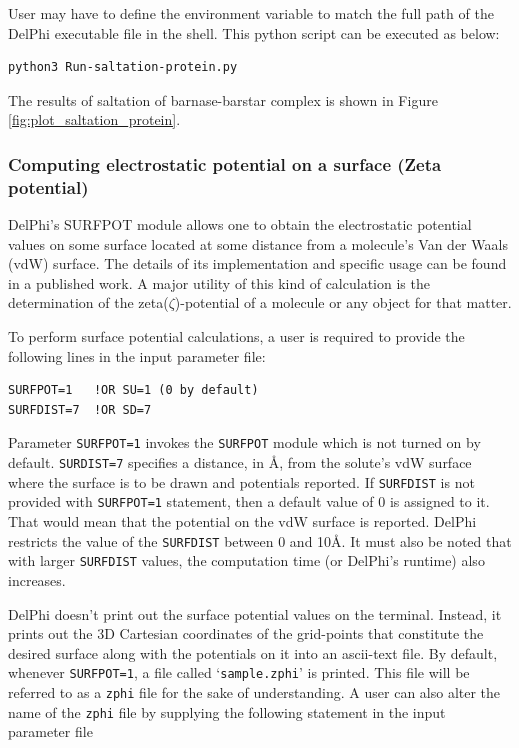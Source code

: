 \documentclass[9pt,tutorial]{livecoms}
\newcommand*\ttvar[1]{\texttt{\expandafter\dottvar\detokenize{#1}\relax}}
\newcommand*\dottvar[1]{\ifx\relax#1\else
  \expandafter\ifx\string_#1\string_\allowbreak\else#1\fi
  \expandafter\dottvar\fi}
\begin{document}
User may have to define the environment variable \ttvar{$DELPHI_EXE} to match the full path of the DelPhi executable file in the shell. This python script can be executed as below:

\begin{verbatim}
python3 Run-saltation-protein.py
\end{verbatim}

The results of saltation of barnase-barstar complex is shown in Figure \ref{fig:plot_saltation_protein}.

\subsubsection{Computing electrostatic potential on a surface (Zeta potential)} 
DelPhi’s SURFPOT module allows one to obtain the electrostatic potential values on some surface located at some distance from a molecule’s Van der Waals (vdW) surface. The details of its implementation and specific usage can be found in a published work\cite{chakravorty2017new}. A major utility of this kind of calculation is the determination of the zeta($\zeta$)-potential of a molecule or any object for that matter. 

To perform surface potential calculations, a user is required to provide the following lines in the input parameter file:

\begin{verbatim}
SURFPOT=1   !OR SU=1 (0 by default)
SURFDIST=7  !OR SD=7
\end{verbatim}

Parameter \texttt{SURFPOT=1} invokes the \texttt{SURFPOT} module which is not turned on by default. \texttt{SURDIST=7} specifies a distance, in Å, from the solute’s vdW surface where the surface is to be drawn and potentials reported. If \texttt{SURFDIST} is not provided with \texttt{SURFPOT=1} statement, then a default value of 0 is assigned to it. That would mean that the potential on the vdW surface is reported. DelPhi restricts the value of the \texttt{SURFDIST} between 0 and 10Å. It must also be noted that with larger \texttt{SURFDIST} values, the computation time (or DelPhi’s runtime) also increases. 

DelPhi doesn’t print out the surface potential values on the terminal. Instead, it prints out the 3D Cartesian coordinates of the grid-points that constitute the desired surface along with the potentials on it into an ascii-text file. By default, whenever \texttt{SURFPOT=1}, a file called ‘\texttt{sample.zphi}’ is printed. This file will be referred to as a \texttt{zphi} file for the sake of understanding. A user can also alter the name of the \texttt{zphi} file by supplying the following statement in the input parameter file
\end{document}
